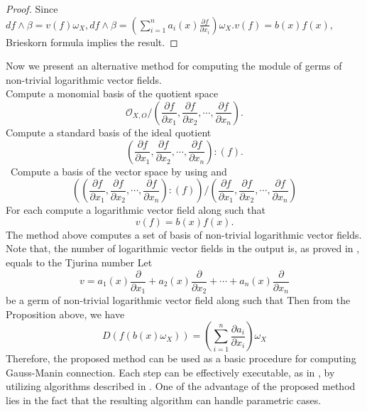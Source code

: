 \documentclass{arxsigma}
\begin{document}
\begin{proof}
Since $ df \wedge \beta = v(f) \omega_X,
 \displaystyle
df \wedge \beta = \left( \sum_{i=1}^{n} a_i(x)\frac{\partial f}{\partial x_i} \right)\omega_X.   v(f) =b(x)f(x), $ Brieskorn formula implies the result.
\end{proof}
Now we present an alternative method for computing the module of germs of non-trivial logarithmic vector fields. \\  Compute a monomial basis   of the quotient space
\begin{equation*}{\mathcal O}_{X,O}/\left(\frac{\partial f}{\partial x_1}, \frac{\partial f}{\partial x_2}, \cdots, \frac{\partial f}{\partial x_n}\right).
\end{equation*}
 Compute a standard basis   of the ideal quotient
\begin{equation*}
\left(\frac{\partial f}{\partial x_1}, \frac{\partial f}{\partial x_2}, \cdots, \frac{\partial f}{\partial x_n}\right) : (f).
\end{equation*}
 \ Compute a basis   of the vector space by using   and  
\begin{equation*}
\left(\left(\frac{\partial f}{\partial x_1}, \frac{\partial f}{\partial x_2}, \cdots, \frac{\partial f}{\partial x_n}\right) : (f)\right)/
\left(\frac{\partial f}{\partial x_1}, \frac{\partial f}{\partial x_2}, \cdots, \frac{\partial f}{\partial x_n}\right)
\end{equation*}
 For each   compute a logarithmic vector field along   such that
\begin{equation*}
v(f)=b(x)f(x).
\end{equation*}
The method above computes a set of basis of non-trivial logarithmic vector fields. Note that, the number of logarithmic vector fields in the output is, as proved in \cite{M, T}, equals to the Tjurina number  
Let
\begin{equation*}
v=a_1(x)\frac{\partial}{\partial x_1} + a_2(x)\frac{\partial}{\partial x_2}+ \cdots +a_n(x)\frac{\partial}{\partial x_n}
\end{equation*}
be a germ of
non-trivial logarithmic vector field along   such that   Then from the Proposition above,
we have
\begin{equation*}
D(f(b(x)\omega_X)) =
\left( \sum_{i=1}^{n} \frac{\partial a_i}{\partial x_i} \right) \omega_X
\end{equation*}
Therefore, the proposed method can be used as a basic procedure for computing Gauss-Manin connection.
Each step can be effectively executable, as in \cite{TN20},
by utilizing algorithms described in \cite{NT16a,NT16b,NT17a,TNN}.
One of the advantage of the proposed method
lies in the fact that the resulting algorithm can handle parametric cases.
\end{document}
